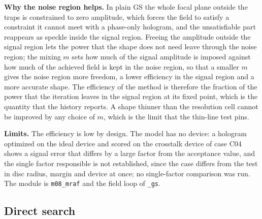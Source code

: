 \textbf{Why the noise region helps.} In plain GS the whole focal plane outside the traps is constrained to zero amplitude, which forces the field to satisfy a constraint it cannot meet with a phase-only hologram, and the unsatisfiable part reappears as speckle inside the signal region. Freeing the amplitude outside the signal region lets the power that the shape does not need leave through the noise region; the mixing $m$ sets how much of the signal amplitude is imposed against how much of the achieved field is kept in the noise region, so that a smaller $m$ gives the noise region more freedom, a lower efficiency in the signal region and a more accurate shape. The efficiency of the method is therefore the fraction of the power that the iteration leaves in the signal region at its fixed point, which is the quantity that the history reports. A shape thinner than the resolution cell cannot be improved by any choice of $m$, which is the limit that the thin-line test pins.

\textbf{Limits.} The efficiency is low by design. The model has no device: a hologram optimized on the ideal device and scored on the crosstalk device of case C04 shows a signal error that differs by a large factor from the acceptance value, and the single factor responsible is not established, since the case differs from the test in disc radius, margin and device at once; no single-factor comparison was run. The module is \texttt{m08\_mraf} and the field loop of \texttt{\_gs}.

\subsection{Direct search}\label{sec:m09}

